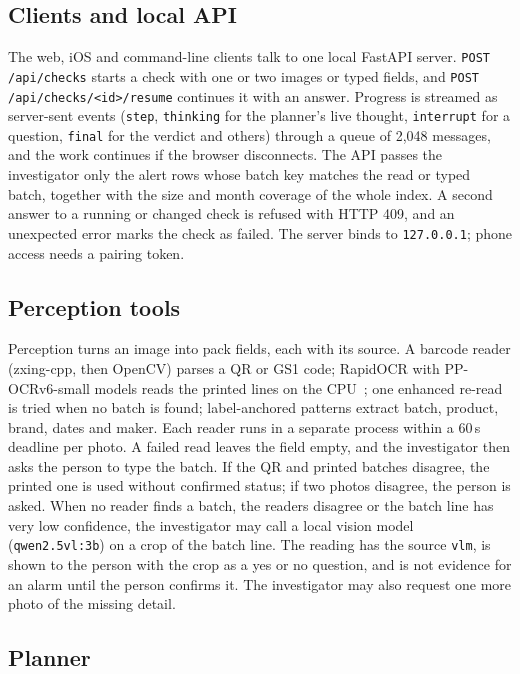 \subsection{Clients and local API}

The web, iOS and command-line clients talk to one local FastAPI server. \texttt{POST /api/checks}
starts a check with one or two images or typed fields, and \texttt{POST /api/\allowbreak checks/<id>/\allowbreak resume}
continues it with an answer. Progress is streamed as server-sent events (\texttt{step},
\texttt{thinking} for the planner's live thought, \texttt{interrupt} for a question, \texttt{final}
for the verdict and others) through a queue of 2{,}048 messages, and the work continues if the browser disconnects. The API passes the investigator only
the alert rows whose batch key matches the read or typed batch, together with the size and month
coverage of the whole index. A second answer to a running or changed check is refused with HTTP
409, and an unexpected error marks the check as failed. The server binds to \texttt{127.0.0.1};
phone access needs a pairing token.

\subsection{Perception tools}

Perception turns an image into pack fields, each with its source. A barcode reader (zxing-cpp,
then OpenCV) parses a QR or GS1 code; RapidOCR with PP-OCRv6-small models reads the printed lines on
the CPU~\cite{rapidai2021rapidocr,du2020ppocr}; one enhanced re-read is tried when no batch is found;
label-anchored patterns extract batch, product, brand, dates and maker. Each reader runs in a
separate process within a 60\,s deadline per photo. A failed read leaves the field empty, and the
investigator then asks the person to type the batch. If the QR and printed batches disagree, the
printed one is used without confirmed status; if two photos disagree, the person is asked. When no
reader finds a batch, the readers disagree or the batch line has very low confidence, the investigator
may call a local vision model (\texttt{qwen2.5vl:3b}) on a crop of the batch line. The reading has the
source \texttt{vlm}, is shown to the person with the crop as a yes or no question, and is not evidence for an alarm
until the person confirms it. The investigator may also request one more photo of the missing detail.

\subsection{Planner}

